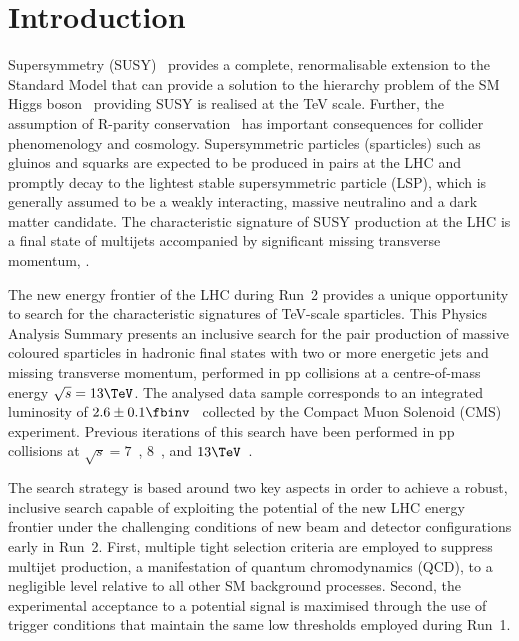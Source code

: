 \section{Introduction}
\label{sec:introduction}

Supersymmetry (SUSY)~\cite{ref:SUSY-1, ref:SUSY0, ref:SUSY1,
  ref:SUSY2, ref:SUSY3, ref:SUSY4, ref:hierarchy1, ref:hierarchy2}
provides a complete, renormalisable extension to the Standard Model
that can provide a solution to the hierarchy problem of the SM Higgs
boson~\cite{ref:atlashiggsdiscovery, ref:cmshiggsdiscovery} providing
SUSY is realised at the TeV scale. Further, the assumption of R-parity
conservation~\cite{Farrar:1978xj} has important consequences for
collider phenomenology and cosmology. Supersymmetric particles
(sparticles) such as gluinos and squarks are expected to be produced
in pairs at the LHC and promptly decay to the lightest stable
supersymmetric particle (LSP), which is generally assumed to be a
weakly interacting, massive neutralino and a dark matter
candidate. The characteristic signature of SUSY production at the LHC
is a final state of multijets accompanied by significant missing
transverse momentum, \ptvecmiss.

The new energy frontier of the LHC during Run~2 provides a unique
opportunity to search for the characteristic signatures of TeV-scale
sparticles. This Physics Analysis Summary presents an inclusive search
for the pair production of massive coloured sparticles in hadronic
final states with two or more energetic jets and missing transverse
momentum, performed in pp collisions at a centre-of-mass energy
$\sqrt{s} = 13\TeV$. The analysed data sample corresponds to an
integrated luminosity of $2.6 \pm 0.1 \fbinv$~\cite{lumi} collected by
the Compact Muon Solenoid (CMS) experiment. Previous iterations of
this search have been performed in pp collisions at $\sqrt{s} =
7$~\cite{RA1Paper, RA1Paper2011, RA1Paper2011FULL},
$8$~\cite{RA1Paper2012, RA1Parked}, and $13\TeV$~\cite{RA1Paper2015}. 

The search strategy is based around two key aspects in order to
achieve a robust, inclusive search capable of exploiting the potential
of the new LHC energy frontier under the challenging conditions of new
beam and detector configurations early in Run~2. First, multiple tight
selection criteria are employed to suppress multijet production, a
manifestation of quantum chromodynamics (QCD), to a negligible level
relative to all other SM background processes. Second, the
experimental acceptance to a potential signal is maximised through the
use of trigger conditions that maintain the same low thresholds
employed during Run~1.

